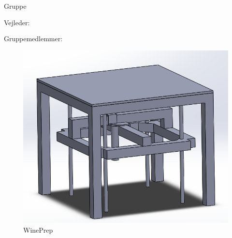 \begin{titlingpage}
	\center
	\HUGE\thetitle
	
	
	\LARGE\ShowProject
	
	\Large Gruppe \ShowGroupNumber
	
	
	
	\normalsize Vejleder: \ShowVejleder
	
	Gruppemedlemmer:
	
	\PrintGroupMembers
\end{titlingpage}

\begin{figure}[H]
	\centerline{\includegraphics[scale=0.5]{winePrep}}
	\caption{WinePrep}
\end{figure}